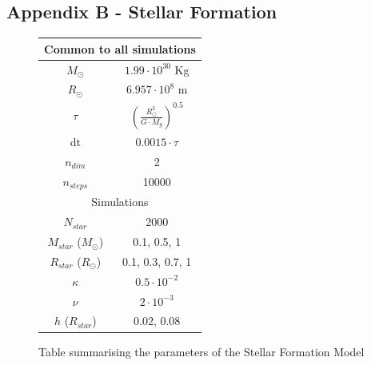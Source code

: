 \documentclass[a4paper,12pt]{article}
\begin{document}
\subsection{Appendix B - Stellar Formation}
\label{sec:AppB}
\begin{figure}[ht!]
\centering
\begin{tabular}{|c|c|}
\hline
\multicolumn{2}{|c|}{Common to all simulations}\\
\hline \hline
 $M_\odot$ & $1.99\cdot 10^{30}$ Kg\\
 $R_\odot$ & $6.957\cdot10^{8}$ m\\
 $\tau$ & $(\frac{R_\odot^3}{G\cdot M_g})^{0.5}$\\
 dt & $0.0015\cdot\tau$\\
 $n_{dim}$ & 2\\
 $n_{steps}$ & 10000\\
 \hline\hline
 \multicolumn{2}{|c|}{Simulations}\\
 \hline\hline
 $N_{star}$ & 2000\\
 $M_{star}$ ($M_\odot$) & 0.1, 0.5, 1\\
 $R_{star}$ ($R_\odot$) & 0.1, 0.3, 0.7, 1\\
 \hline
 $\kappa$ & $0.5\cdot10^{-2}$\\
 $\nu$ & $2\cdot10^{-3}$\\
 $h$ ($R_{star}$) & 0.02, 0.08\\
 \hline
\end{tabular}
\caption{Table summarising the parameters of the Stellar Formation Model}
\end{figure}
\end{document}
